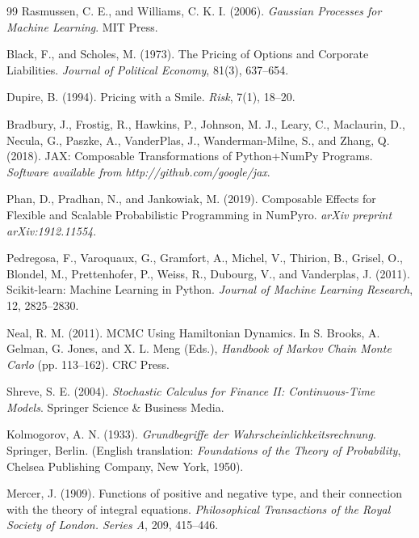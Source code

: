 \documentclass[12pt,oneside]{report}
\theoremstyle{definition}
\theoremstyle{remark}
\begin{document}
\begin{thebibliography}{99}
Rasmussen, C. E., and Williams, C. K. I. (2006).
\textit{Gaussian Processes for Machine Learning}.
MIT Press.

Black, F., and Scholes, M. (1973).
The Pricing of Options and Corporate Liabilities.
\textit{Journal of Political Economy}, 81(3), 637--654.

Dupire, B. (1994).
Pricing with a Smile.
\textit{Risk}, 7(1), 18--20.

Bradbury, J., Frostig, R., Hawkins, P., Johnson, M. J., Leary, C., Maclaurin, D., Necula, G., Paszke, A., VanderPlas, J., Wanderman-Milne, S., and Zhang, Q. (2018).
{JAX}: Composable Transformations of {Python}+{NumPy} Programs.
\textit{Software available from http://github.com/google/jax}.

Phan, D., Pradhan, N., and Jankowiak, M. (2019).
Composable Effects for Flexible and Scalable Probabilistic Programming in {NumPyro}.
\textit{arXiv preprint arXiv:1912.11554}.

Pedregosa, F., Varoquaux, G., Gramfort, A., Michel, V., Thirion, B., Grisel, O., Blondel, M., Prettenhofer, P., Weiss, R., Dubourg, V., and Vanderplas, J. (2011).
Scikit-learn: Machine Learning in {Python}.
\textit{Journal of Machine Learning Research}, 12, 2825--2830.

Neal, R. M. (2011).
{MCMC} Using Hamiltonian Dynamics.
In S. Brooks, A. Gelman, G. Jones, and X. L. Meng (Eds.), \textit{Handbook of Markov Chain Monte Carlo} (pp. 113--162). CRC Press.

Shreve, S. E. (2004).
\textit{Stochastic Calculus for Finance II: Continuous-Time Models}.
Springer Science \& Business Media.

Kolmogorov, A. N. (1933).
\textit{Grundbegriffe der Wahrscheinlichkeitsrechnung}.
Springer, Berlin. (English translation: \textit{Foundations of the Theory of Probability}, Chelsea Publishing Company, New York, 1950).

Mercer, J. (1909).
Functions of positive and negative type, and their connection with the theory of integral equations.
\textit{Philosophical Transactions of the Royal Society of London. Series A}, 209, 415--446.


\end{thebibliography}
\end{document}
